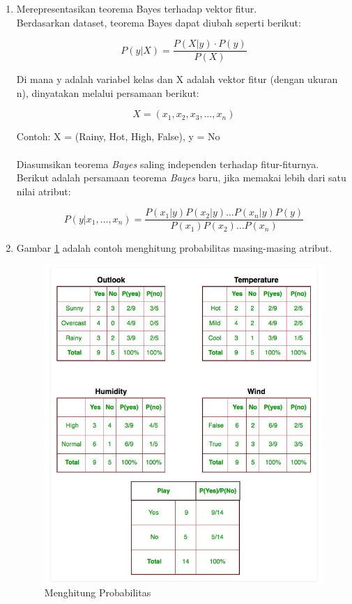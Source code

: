 \documentclass[a4paper,twoside]{article}
\begin{document}
\begin{enumerate}
\begin{enumerate}
\item Merepresentasikan teorema Bayes terhadap vektor fitur.\\
Berdasarkan dataset, teorema Bayes dapat diubah seperti berikut:

\begin{equation}
P(y|X) = \frac{P(X|y) \cdot P(y)}{P(X)}
\end{equation}

Di mana y adalah variabel kelas dan X adalah vektor fitur (dengan ukuran n), dinyatakan melalui persamaan berikut:

\begin{equation}
X = (x_1, x_2, x_3, \ldots, x_n)
\end{equation}

Contoh: X = (Rainy, Hot, High, False), y = No
\\\\
Diasumsikan teorema \textit{Bayes} saling independen terhadap fitur-fiturnya. Berikut adalah persamaan teorema \textit{Bayes} baru, jika memakai lebih dari satu nilai atribut:

\begin{equation}
P(y|x_1,\ldots,x_n) = \frac{P(x_1|y) P(x_2|y) \ldots P(x_n|y) P(y)}{P(x_1) P(x_2) \ldots P(x_n)}
\end{equation}


\item Gambar \ref{fig:naive_bayes2} adalah contoh menghitung probabilitas masing-masing atribut.

\begin{figure}[H]
	\centering
	\includegraphics[scale=0.55]{naive_bayes2}
	\caption{Menghitung Probabilitas}
	\label{fig:naive_bayes2}
\end{figure}


\end{enumerate}
\end{enumerate}
\end{document}
